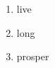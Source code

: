 \documentclass{article}
\begin{document}
\begin{enumerate}[label=\Nthwords*]
  \item live
  \item long
  \item prosper
\end{enumerate}
\end{document}
